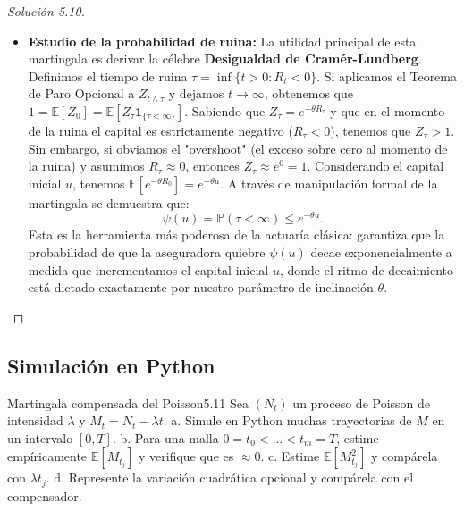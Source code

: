 \documentclass[10pt,a4paper]{article}
\begin{document}
\begin{proof}[Solución  5.10]
\begin{itemize}
        \item \textbf{Estudio de la probabilidad de ruina:} La utilidad principal de esta martingala es derivar la célebre \textbf{Desigualdad de Cramér-Lundberg}.
        Definimos el tiempo de ruina $\tau = \inf\{t > 0 : R_t < 0\}$.
        Si aplicamos el Teorema de Paro Opcional a $Z_{t \wedge \tau}$ y dejamos $t \to \infty$, obtenemos que $1 = \mathbb{E}[Z_0] = \mathbb{E}[Z_\tau \mathbf{1}_{\{\tau < \infty\}}]$.
        Sabiendo que $Z_\tau = e^{-\theta R_\tau}$ y que en el momento de la ruina el capital es estrictamente negativo ($R_\tau < 0$), tenemos que $Z_\tau > 1$. Sin embargo, si obviamos el "overshoot" (el exceso sobre cero al momento de la ruina) y asumimos $R_\tau \approx 0$, entonces $Z_\tau \approx e^0 = 1$.
        Considerando el capital inicial $u$, tenemos $\mathbb{E}[e^{-\theta R_0}] = e^{-\theta u}$.
        A través de manipulación formal de la martingala se demuestra que:
        \[ \psi(u) = \mathbb{P}(\tau < \infty) \le e^{-\theta u}. \]
        Esta es la herramienta más poderosa de la actuaría clásica: garantiza que la probabilidad de que la aseguradora quiebre $\psi(u)$ decae exponencialmente a medida que incrementamos el capital inicial $u$, donde el ritmo de decaimiento está dictado exactamente por nuestro parámetro de inclinación $\theta$.
    \end{itemize}
\end{proof}

\newpage
\subsection{Simulación en Python}

\begin{ejercicio}{Martingala compensada del Poisson}{5.11}
    Sea $(N_t)$ un proceso de Poisson de intensidad $\lambda$ y $M_t = N_t - \lambda t$.
    a. Simule en Python muchas trayectorias de $M$ en un intervalo $[0,T]$.
    b. Para una malla $0 = t_0 < \dots < t_m = T$, estime empíricamente $\mathbb{E}[M_{t_j}]$ y verifique que es $\approx 0$.
    c. Estime $\mathbb{E}[M_{t_j}^2]$ y compárela con $\lambda t_j$.
    d. Represente la variación cuadrática opcional y compárela con el compensador.
\end{ejercicio}
\end{document}
